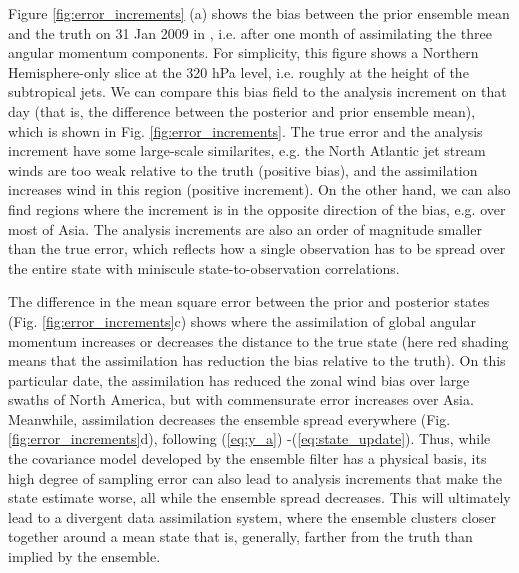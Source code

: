 Figure \ref{fig:error_increments} (a) shows the bias between the prior ensemble mean and the truth on 31 Jan 2009 in \ERPALL, i.e. after one month of assimilating the three angular momentum components. 
For simplicity, this figure shows a Northern Hemisphere-only slice at the 320 hPa level, i.e. roughly at the height of the subtropical jets.
We can compare this bias field to the analysis increment on that day (that is, the difference between the posterior and prior ensemble mean), which is shown in Fig. \ref{fig:error_increments}.
The true error and the analysis increment have some large-scale similarites, e.g. the North Atlantic jet stream winds are too weak relative to the truth (positive bias), and the assimilation increases wind in this region (positive increment). 
On the other hand, we can also find regions where the increment is in the opposite direction of the bias, e.g. over most of Asia. 
The analysis increments are also an order of magnitude smaller than the true error, which reflects how a single observation has to be spread over the entire state with 
miniscule state-to-observation correlations.

The difference in the mean square error between the prior and posterior states (Fig. \ref{fig:error_increments}c) shows where the assimilation of global angular momentum increases or decreases the distance to the true state (here red shading means that the assimilation has reduction the bias relative to the truth).  
On this particular date, the assimilation has reduced the zonal wind bias over large swaths of North America, but with commensurate error increases over Asia. 
Meanwhile, assimilation decreases the ensemble spread everywhere (Fig. \ref{fig:error_increments}d), following (\ref{eq:y_a}) -(\ref{eq:state_update}).  
Thus, while the covariance model developed by the ensemble filter has a physical basis, its high degree of sampling error can also lead to analysis increments that make the state estimate worse, all while the ensemble spread decreases.  
This will ultimately lead to a divergent data assimilation system, where the ensemble clusters closer together around a mean state that is, generally, farther from the truth than implied by the ensemble. 


